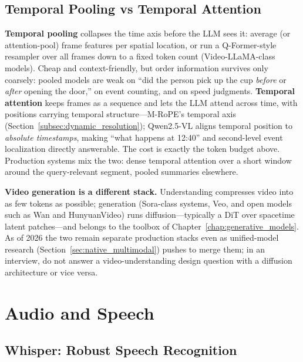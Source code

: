 \subsection{Temporal Pooling vs Temporal Attention}

\textbf{Temporal pooling} collapses the time axis before the LLM sees it: average (or attention-pool) frame features per spatial location, or run a Q-Former-style resampler over all frames down to a fixed token count (Video-LLaMA-class models). Cheap and context-friendly, but order information survives only coarsely: pooled models are weak on ``did the person pick up the cup \textit{before} or \textit{after} opening the door,'' on event counting, and on speed judgments. \textbf{Temporal attention} keeps frames as a sequence and lets the LLM attend across time, with positions carrying temporal structure---M-RoPE's temporal axis (Section~\ref{subsec:dynamic_resolution}); Qwen2.5-VL aligns temporal position to \textit{absolute timestamps}, making ``what happens at 12:40'' and second-level event localization directly answerable. The cost is exactly the token budget above. Production systems mix the two: dense temporal attention over a short window around the query-relevant segment, pooled summaries elsewhere.

\textbf{Video generation is a different stack.} Understanding compresses video into as few tokens as possible; generation (Sora-class systems, Veo, and open models such as Wan and HunyuanVideo) runs diffusion---typically a DiT over spacetime latent patches---and belongs to the toolbox of Chapter~\ref{chap:generative_models}. As of 2026 the two remain separate production stacks even as unified-model research (Section~\ref{sec:native_multimodal}) pushes to merge them; in an interview, do not answer a video-understanding design question with a diffusion architecture or vice versa.

\section{Audio and Speech}
\label{sec:audio_speech}

\subsection{Whisper: Robust Speech Recognition}

